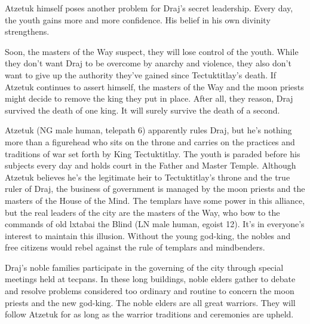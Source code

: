 {	Atzetuk himself poses another problem for Draj's secret leadership. Every day, the youth gains more and more confidence. His belief in his own divinity strengthens.

	Soon, the masters of the Way suspect, they will lose control of the youth. While they don't want Draj to be overcome by anarchy and violence, they also don't want to give up the authority they've gained since Tectuktitlay's death. If Atzetuk continues to assert himself, the masters of the Way and the moon priests might decide to remove the king they put in place. After all, they reason, Draj survived the death of one king. It will surely survive the death of a second.
}
{
	Atzetuk (NG male human, telepath 6) apparently rules Draj, but he's nothing more than a figurehead who sits on the throne and carries on the practices and traditions of war set forth by King Tectuktitlay. The youth is paraded before his subjects every day and holds court in the Father and Master Temple. Although Atzetuk believes he's the legitimate heir to Tectuktitlay's throne and the true ruler of Draj, the business of government is managed by the moon priests and the masters of the House of the Mind. The templars have some power in this alliance, but the real leaders of the city are the masters of the Way, who bow to the commands of old lxtabai the Blind (LN male human, egoist 12). It's in everyone's interest to maintain this illusion. Without the young god-king, the nobles and free citizens would rebel against the rule of templars and mindbenders.

	Draj's noble families participate in the governing of the city through special meetings held at tecpans. In these long buildings, noble elders gather to debate and resolve problems considered too ordinary and routine to concern the moon priests and the new god-king. The noble elders are all great warriors. They will follow Atzetuk for as long as the warrior traditions and ceremonies are upheld.
}
